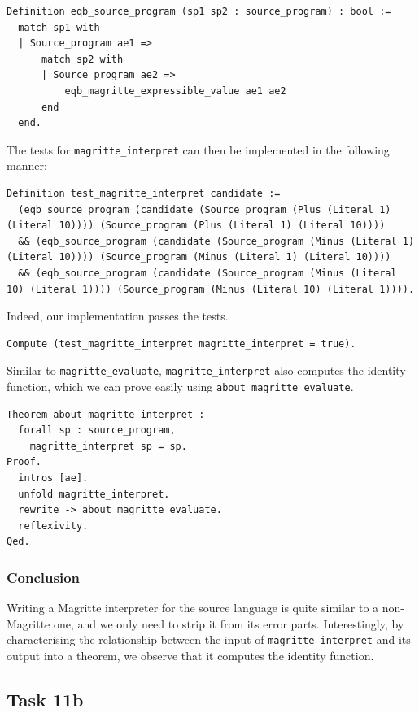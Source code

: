 \documentclass{article}
\begin{document}
\begin{lstlisting}
Definition eqb_source_program (sp1 sp2 : source_program) : bool :=
  match sp1 with
  | Source_program ae1 =>
      match sp2 with
      | Source_program ae2 =>
          eqb_magritte_expressible_value ae1 ae2
      end
  end.
\end{lstlisting}

The tests for \texttt{magritte\_interpret} can then be implemented in the following manner:

\begin{lstlisting}
Definition test_magritte_interpret candidate :=
  (eqb_source_program (candidate (Source_program (Plus (Literal 1) (Literal 10)))) (Source_program (Plus (Literal 1) (Literal 10))))
  && (eqb_source_program (candidate (Source_program (Minus (Literal 1) (Literal 10)))) (Source_program (Minus (Literal 1) (Literal 10))))
  && (eqb_source_program (candidate (Source_program (Minus (Literal 10) (Literal 1)))) (Source_program (Minus (Literal 10) (Literal 1)))).
\end{lstlisting}

Indeed, our implementation passes the tests.

\begin{lstlisting}
Compute (test_magritte_interpret magritte_interpret = true).
\end{lstlisting}

Similar to \texttt{magritte\_evaluate}, \texttt{magritte\_interpret} also computes the identity function, which we can prove easily using \texttt{about\_magritte\_evaluate}.
\begin{lstlisting}
Theorem about_magritte_interpret :
  forall sp : source_program,
    magritte_interpret sp = sp.
Proof.
  intros [ae].
  unfold magritte_interpret.
  rewrite -> about_magritte_evaluate.
  reflexivity.
Qed.
\end{lstlisting}

\subsubsection{Conclusion}
Writing a Magritte interpreter for the source language is quite similar to a non-Magritte one, and we only need to strip it from its error parts. Interestingly, by characterising the relationship between the input of \texttt{magritte\_interpret} and its output into a theorem, we observe that it computes the identity function.

\subsection{Task 11b}
\end{document}
